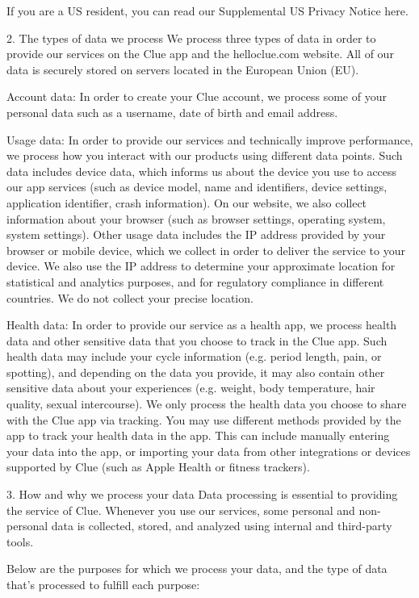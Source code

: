 If you are a US resident, you can read our Supplemental US Privacy Notice here.

2. The types of data we process
We process three types of data in order to provide our services on the Clue app and the helloclue.com website. All of our data is securely stored on servers located in the European Union (EU).

Account data: In order to create your Clue account, we process some of your personal data such as a username, date of birth and email address.

Usage data: In order to provide our services and technically improve performance, we process how you interact with our products using different data points. Such data includes device data, which informs us about the device you use to access our app services (such as device model, name and identifiers, device settings, application identifier, crash information). On our website, we also collect information about your browser (such as browser settings, operating system, system settings). Other usage data includes the IP address provided by your browser or mobile device, which we collect in order to deliver the service to your device. We also use the IP address to determine your approximate location for statistical and analytics purposes, and for regulatory compliance in different countries. We do not collect your precise location.

Health data: In order to provide our service as a health app, we process health data and other sensitive data that you choose to track in the Clue app. Such health data may include your cycle information (e.g. period length, pain, or spotting), and depending on the data you provide, it may also contain other sensitive data about your experiences (e.g. weight, body temperature, hair quality, sexual intercourse). We only process the health data you choose to share with the Clue app via tracking. You may use different methods provided by the app to track your health data in the app. This can include manually entering your data into the app, or importing your data from other integrations or devices supported by Clue (such as Apple Health or fitness trackers).

3. How and why we process your data
Data processing is essential to providing the service of Clue. Whenever you use our services, some personal and non-personal data is collected, stored, and analyzed using internal and third-party tools.

Below are the purposes for which we process your data, and the type of data that’s processed to fulfill each purpose:

